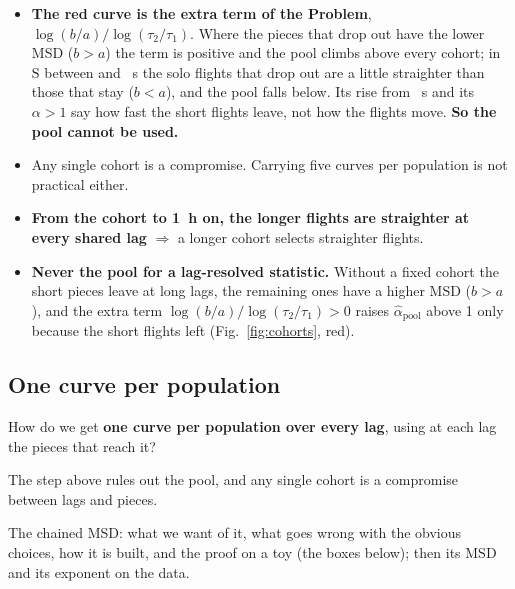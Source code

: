 \documentclass[10pt,a4paper]{article}
\newcommand{\Sl}{\mathrm{S}}
\newcommand{\Q}{\item[\textcolor{question}{\textbf{Q.}}]\color{question}}
\newcommand{\Home}{\item[\textcolor{answer}{\textbf{Take home.}}]\color{black}}
\newcommand{\Why}{\item[\textcolor{black}{\textbf{Why.}}]\color{black}}
\newcommand{\Tool}{\item[\textcolor{black}{\textbf{Tool.}}]\color{black}}
\newenvironment{step}{\begin{description}[leftmargin=0pt, itemsep=7pt, topsep=8pt]}{\end{description}}
\begin{document}
\begin{step}
\begin{itemize}
  \item \textbf{The red curve is the extra term of the Problem}, $\log(b/a)/\log(\tau_2/\tau_1)$. Where the
    pieces that drop out have the lower MSD ($b>a$) the term is positive and the pool climbs above every cohort;
    in $\Sl$ between \PoolLeave{} and \PoolBelowEnd~s the solo flights that drop out are a little straighter than
    those that stay ($b<a$), and the pool falls below. Its rise from \PoolSteep~s and its $\alpha>1$ say how
    fast the short flights leave, not how the flights move. \textbf{So the pool cannot be used.}
  \item Any single cohort is a compromise. Carrying five curves per population is not practical either.
  \end{itemize}
\Home\mbox{}
  \begin{itemize}
  \item \textbf{From the cohort to 1~h on, the longer flights are straighter at every shared lag}
    $\Longrightarrow$ a longer cohort selects straighter flights.
  \item \textbf{Never the pool for a lag-resolved statistic.} Without a fixed cohort the short pieces leave at
    long lags, the remaining ones have a higher MSD ($b>a$), and the extra term
    $\log(b/a)/\log(\tau_2/\tau_1)>0$ raises $\hat\alpha_\mathrm{pool}$ above 1 only because the short flights
    left (Fig.~\ref{fig:cohorts}, red).
  \end{itemize}
\end{step}

\subsection{One curve per population}\label{which-cohort}

\begin{step}
\Q How do we get \textbf{one curve per population over every lag}, using at each lag the pieces that reach it?
\Why The step above rules out the pool, and any single cohort is a compromise between lags and pieces.
\Tool The chained MSD: what we want of it, what goes wrong with the obvious choices, how it is built, and the proof
  on a toy (the boxes below); then its MSD and its exponent on the data.
\end{step}
\end{document}
